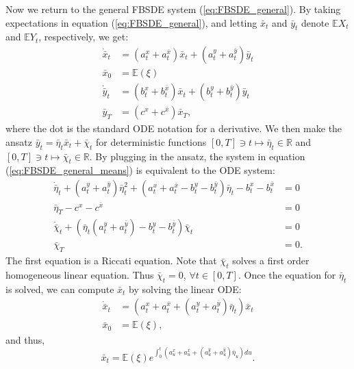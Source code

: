 \documentclass[11pt]{article}
\begin{document}
\begin{appendices}
Now we return to the general FBSDE system (\ref{eq:FBSDE_general}). By taking expectations in equation (\ref{eq:FBSDE_general}), and letting $\bar{x}_t$ and $\bar{y}_t$ denote $\mathbb{E}X_t$ and $\mathbb{E}Y_t$, respectively, we get:
\begin{equation}
\begin{split}
        \dot{\bar{x}}_t&=(a^x_t+a^{\bar{x}}_t)\bar{x}_t+(a^y_t+a^{\bar{y}}_t)\bar{y}_t\\
        \bar{x}_0&=\mathbb{E}(\xi) \\
        \dot{\bar{y}}_t&=(b^x_t+b^{\bar{x}}_t)\bar{x}_t+(b^y_t+b^{\bar{y}}_t)\bar{y}_t\\
        \bar{y}_T&=(c^x+c^{\bar{x}})\bar{x}_T,
\end{split}
\label{eq:FBSDE_general_means}
\end{equation}
where the dot is the standard ODE notation for a derivative. We then make the ansatz $\bar{y}_t=\bar{\eta}_t\bar{x}_t+\bar{\chi}_t$ for deterministic functions $[0,T] \ni t \mapsto \bar{\eta}_t \in \mathbb{R}$ and $[0,T] \ni t \mapsto \bar{\chi}_t \in \mathbb{R}$. By plugging in the ansatz, the system in equation (\ref{eq:FBSDE_general_means}) is equivalent to the ODE system:
\begin{equation*}
\begin{split}
    \dot{\bar{\eta}}_t+(a^y_t+a^{\bar{y}}_t) \bar{\eta}_t^2+(a^x_t+a^{\bar{x}}_t-b^y_t-b^{\bar{y}}_t) \bar{\eta}_t -b^x_t-b^{\bar{x}}_t&=0\\
    \bar{\eta}_T-c^x-c^{\bar{x}}&=0 \\
    \dot{\bar{\chi}}_t+(\bar{\eta}_t(a^y_t+a^{\bar{y}}_t)-b^y_t-b^{\bar{y}}_t)\bar{\chi}_t &=0\\
    \bar{\chi}_T&=0.
\end{split}
\end{equation*}
The first equation is a Riccati equation. Note that $\bar{\chi}_t$ solves a first order homogeneous linear equation. Thus $\bar{\chi}_t=0$, $\forall t\in[0,T]$. Once the equation for $\bar{\eta}_t$ is solved, we can compute $\bar{x}_t$ by solving the linear ODE:
\begin{equation*}
\begin{split}
    \dot{\bar{x}}_t&=(a^x_t+a^{\bar{x}}_t+(a^y_t+a^{\bar{y}}_t)\bar{\eta}_t)\bar{x}_t \\
    \bar{x}_0&=\mathbb{E}(\xi),
\end{split}
\end{equation*}
and thus,
\begin{equation*}
    \bar{x}_t=\mathbb{E}(\xi) e^{\int_0^t(a^x_u+a^{\bar{x}}_u+(a^y_u+a^{\bar{y}}_u)\bar{\eta}_u)du}.
\end{equation*}


\end{appendices}
\end{document}

